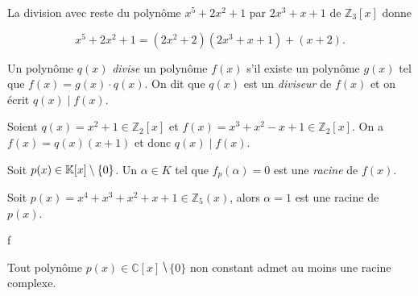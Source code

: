 

\begin{example}
  \label{exe:24}
  La division avec reste du polynôme $x^5+2x^2+1$ par $2x^3+x+1$ de $ℤ_3[x]$ donne

  \begin{displaymath}
    x^5+2x^2+1 = (2x^2 +2) (2x^3 + x +1) + (x+2). 
  \end{displaymath}
  
\end{example}






\begin{definition}
  \label{def:32}
  Un polynôme  $q(x)$ \emph{divise} un  polynôme $f(x)$ s'il existe un polynôme $g(x)$ tel que $f(x) = g(x) \cdot q(x)$. On dit que $q(x)$ est un \emph{diviseur} de $f(x)$ et on écrit $q(x) \mid f(x)$. 
\end{definition}


\begin{example}
  \label{exe:41}
  Soient $q(x) = x^2 +1 ∈ℤ_2[x]$ et $ f(x) = x^3 + x^2 - x+1 ∈ ℤ_2[x]$. On a
  $f(x) = q(x) (x+1)$ et donc 
   $q(x) \mid f(x)$. 
\end{example}


\begin{definition}
  \label{def:31}
  Soit $p(x) \in \mathbb{K}[x] \setminus\{0\}$. Un $\alpha \in K$ tel que $f_p(\alpha) = 0$ est une  \emph{racine} de $f(x)$.  
\end{definition}


\begin{example}
  \label{exe:40}
  Soit $p(x) = x^4 + x^3 + x^2 + x + 1 ∈ ℤ_5(x)$, alors $α = 1$ est une racine de $p(x)$. 
\end{example}f


\begin{theorem}
  \label{thr:44}
  Tout polynôme $p(x) ∈ℂ[x] ⧹\{0\}$ non constant admet au moins une racine complexe.
\end{theorem}




